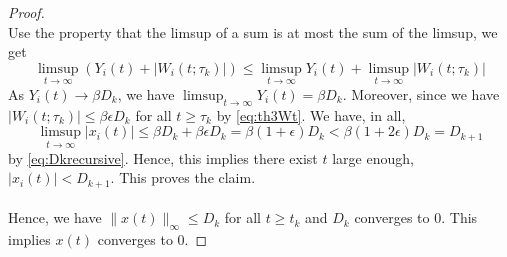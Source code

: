 \begin{proof}
\begin{equation}
    \end{equation}
    Use the property that the limsup of a sum is at most the sum of the limsup, we get
    $$
    \limsup_{t\to\infty} (Y_i(t) + |W_i(t;\tau_k)|)\le \limsup_{t\to\infty} Y_i(t) + \limsup_{t\to\infty} |W_i(t;\tau_k)|
    $$
    As $Y_i(t)\to \beta D_k$, we have $\limsup_{t\to \infty} Y_i(t) = \beta D_k$. Moreover, since we have $|W_i(t;\tau_k)|\le \beta\epsilon D_k$ for all $t\ge \tau_k$ by \autoref{eq:th3Wt}. We have, in all,
    $$
    \limsup_{t\to\infty} |x_i(t)| \le \beta D_k  + \beta \epsilon D_k = \beta(1+\epsilon) D_k<\beta(1+2\epsilon) D_k =D_{k+1}
    $$
    by \autoref{eq:Dkrecursive}. Hence, this implies there exist $t$ large enough, $|x_i(t)|<D_{k+1}$. This proves the claim.\\
    \\
    Hence, we have $\|x(t)\|_\infty\le D_k$ for all $t\ge t_k$ and $D_k$ converges to $0$. This implies $x(t)$ converges to $0$.
\end{proof}
